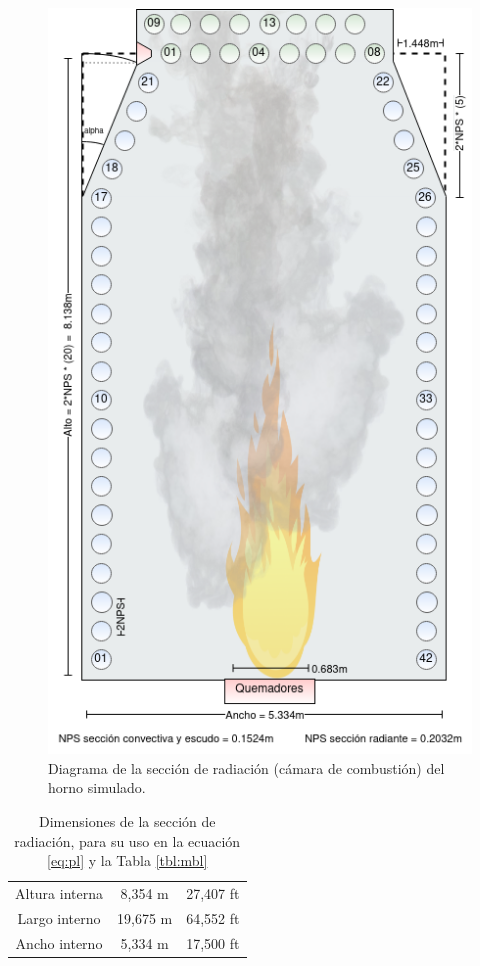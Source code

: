 \begin{figure}[hbt] \begin{center}
\includegraphics[scale=0.455]{images/firebox}
\caption[Diagrama de la sección de radiación]
{Diagrama de la sección de radiación (cámara de combustión) del horno simulado.}
\label{fig:firebox} \end{center} \end{figure}
\begin{table}[H] \begin{center}
\caption[Dimensiones de la sección de radiación]
{Dimensiones de la sección de radiación, para su uso en la ecuación \ref{eq:pl} y la Tabla \ref{tbl:mbl}}
\label{tbl:firebox} \begin{tabular}{c|c|c}
Altura interna	&  8,354 m & 27,407 ft\\
Largo interno 	& 19,675 m & 64,552 ft\\
Ancho interno 	&  5,334 m & 17,500 ft\\
\end{tabular} \end{center} \end{table}
